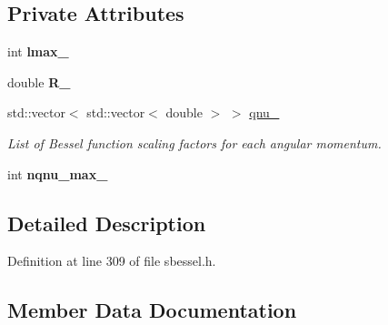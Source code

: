 \subsection*{Private Attributes}
\begin{DoxyCompactItemize}
\item 
\hypertarget{classsirius_1_1_spherical___bessel__approximant_ae6ac2ef33d36b1fd8f8ea98ec1e9445a}{}int {\bfseries lmax\+\_\+}\label{classsirius_1_1_spherical___bessel__approximant_ae6ac2ef33d36b1fd8f8ea98ec1e9445a}

\item 
\hypertarget{classsirius_1_1_spherical___bessel__approximant_a1d1f56acecc433ec59ed53d3f6711142}{}double {\bfseries R\+\_\+}\label{classsirius_1_1_spherical___bessel__approximant_a1d1f56acecc433ec59ed53d3f6711142}

\item 
std\+::vector$<$ std\+::vector$<$ double $>$ $>$ \hyperlink{classsirius_1_1_spherical___bessel__approximant_a88c4834eb7bc83ed0a580a8108dc9aaf}{qnu\+\_\+}
\begin{DoxyCompactList}\small\item\em List of Bessel function scaling factors for each angular momentum. \end{DoxyCompactList}\item 
\hypertarget{classsirius_1_1_spherical___bessel__approximant_aa839bde70058381325fe087de0c259a4}{}int {\bfseries nqnu\+\_\+max\+\_\+}\label{classsirius_1_1_spherical___bessel__approximant_aa839bde70058381325fe087de0c259a4}

\end{DoxyCompactItemize}


\subsection{Detailed Description}


Definition at line 309 of file sbessel.\+h.



\subsection{Member Data Documentation}
\hypertarget{classsirius_1_1_spherical___bessel__approximant_a88c4834eb7bc83ed0a580a8108dc9aaf}{}
